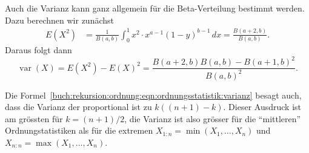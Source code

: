 Auch die Varianz kann ganz allgemein für die Beta-Verteilung
bestimmt werden.
Dazu berechnen wir zunächst
\begin{align*}
E(X^2)
&=
\frac{1}{B(a,b)}
\int_0^1
x^2\cdot x^{a-1}(1-y)^{b-1}\,dx
=
\frac{B(a+2,b)}{B(a,b)}.
\end{align*}
Daraus folgt dann 
\[
\operatorname{var}(X)
=
E(X^2)-E(X)^2
=
\frac{B(a+2,b)B(a,b)-B(a+1,b)^2}{B(a,b)^2}.
\]

Die Formel~\eqref{buch:rekursion:ordnung:eqn:ordnungsstatistik:varianz}
besagt auch, dass die Varianz der proportional ist zu $k((n+1)-k)$.
Dieser Ausdruck ist am grössten für $k=(n+1)/2$, die Varianz ist
also grösser für die ``mittleren'' Ordnungstatistiken als für die
extremen $X_{1:n}=\operatorname{min}(X_1,\dots,X_n)$ und
$X_{n:n}=\operatorname{max}(X_1,\dots,X_n)$.


